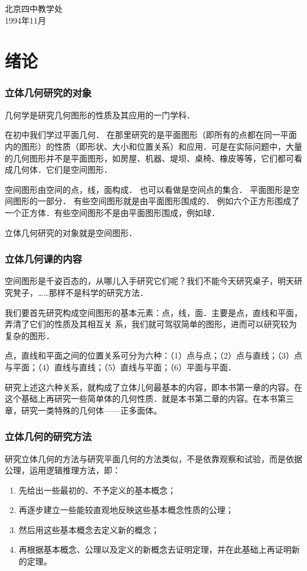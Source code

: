 \begin{flushright}
    北京四中教学处\\
    1994年11月
\end{flushright}

\chapter{绪论}

\subsection*{立体几何研究的对象}
几何学是研究几何图形的性质及其应用的一门学科．

在初中我们学过平面几何． 在那里研究的是平面图形（即所有的点都在同一平面内的图形）的性质（即形状、大小和位置关系）和应用．可是在实际问题中，大量的几何图形并不是平面图形，如房屋、机器、堤坝、桌椅、橡皮等等，它们都可看成几何体．它们是空间图形．

空间图形由空间的点，线，面构成． 也可以看做是空间点的集合． 平面图形是空间图形的一部分． 有些空间图形就是由平面图形围成的． 例如六个正方形围成了一个正方体．有些空间图形不是由平面图形围成，例如球．

立体几何研究的对象就是空间图形．

\subsection*{立体几何课的内容}
空间图形是千姿百态的，从哪儿入手研究它们呢？我们不能今天研究桌子，明天研究凳子，……那样不是科学的研究方法．

我们要首先研究构成空间图形的基本元素：点，线，面．主要是点，直线和平面，弄清了它们的性质及其相互关
系，我们就可驾驭简单的图形，进而可以研究较为复杂的图形．

点，直线和平面之间的位置关系可分为六种：（1）点与点；（2）点与直线；（3）点与平面；（4）直线与直线；（5）直线与平面；（6）平面与平面．

研究上述这六种关系，就构成了立体儿何最基本的内容，即本书第一章的内容。在这个基础上再研究一些简单体的几何性质．就是本书第二章的内容。在本书第三章，研究一类特殊的几何体——正多面体。

\subsection*{立体几何的研究方法}
研究立体几何的方法与研究平面几何的方法类似，不是依靠观察和试验，而是依据公理，运用逻辑推理方法，即：
\begin{enumerate}
    \item 先给出一些最初的、不予定义的基本概念；
    \item 再逐步建立一些能较直观地反映这些基本概念性质的公理；
    \item 然后用这些基本概念去定义新的概念；
    \item 再根据基本概念、公理以及定义的新概念去证明定理，并在此基础上再证明新的定理。
\end{enumerate}

